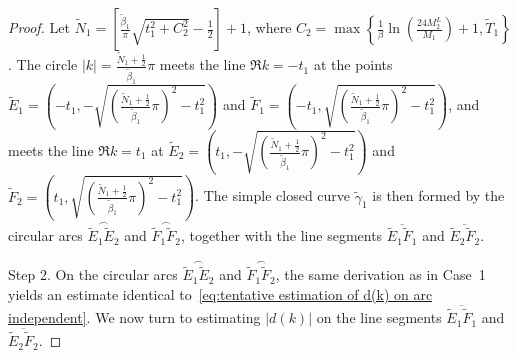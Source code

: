 \documentclass[11pt,reqno]{amsart}
\theoremstyle{definition}
\theoremstyle{remark}
\numberwithin{equation}{section}
\begin{document}
\begin{proof}
Let $\widetilde{N}_1=\left[\frac{\tilde{\beta}_1}{\pi}\sqrt{t_1^2+C_2^2}-\frac{1}{2}\right]+1$, where $C_2=\max\left\{\frac{1}{\beta}\ln\left(\frac{24M_2^L}{M_1}\right)+1,\widetilde{T}_1\right\}$. The circle $|k|=\frac{\widetilde{N}_1+\frac{1}{2}}{\tilde{\beta}_1}\pi$ meets the line $\Re k=-t_1$ at the points  
$\widetilde{E}_1=\left(-t_1,-\sqrt{\left(\frac{\widetilde{N}_1+\frac{1}{2}}{\tilde{\beta}_1}\pi\right)^2-t_1^2}\right)$ and  
$\widetilde{F}_1=\left(-t_1,\sqrt{\left(\frac{\widetilde{N}_1+\frac{1}{2}}{\tilde{\beta}_1}\pi\right)^2-t_1^2}\right)$,  
and meets the line $\Re k=t_1$ at  
$\widetilde{E}_2=\left(t_1,-\sqrt{\left(\frac{\widetilde{N}_1+\frac{1}{2}}{\tilde{\beta}_1}\pi\right)^2-t_1^2}\right)$ and  
$\widetilde{F}_2=\left(t_1,\sqrt{\left(\frac{\widetilde{N}_1+\frac{1}{2}}{\tilde{\beta}_1}\pi\right)^2-t_1^2}\right)$.  
The simple closed curve $\widetilde{\gamma}_1$ is then formed by the circular arcs $\overset{\frown}{\widetilde{E}_1\widetilde{E}_2}$ and $\overset{\frown}{\widetilde{F}_1\widetilde{F}_2}$, together with the line segments $\overline{\widetilde{E}_1\widetilde{F}_1}$ and $\overline{\widetilde{E}_2\widetilde{F}_2}$.

Step 2. On the circular arcs $\overset{\frown}{\widetilde{E}_1\widetilde{E}_2}$ and $\overset{\frown}{\widetilde{F}_1\widetilde{F}_2}$, the same derivation as in Case~1 yields an estimate identical to~\eqref{eq:tentative estimation of d(k) on arc independent}. We now turn to estimating $|d(k)|$ on the line segments $\overline{\widetilde{E}_1\widetilde{F}_1}$ and $\overline{\widetilde{E}_2\widetilde{F}_2}$.
     

\end{proof}
\end{document}
